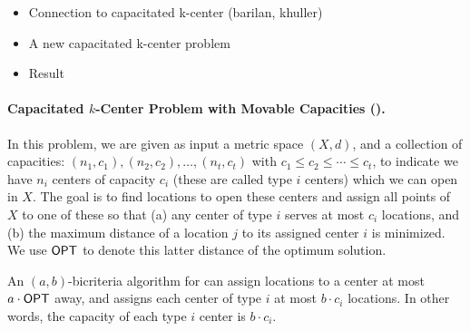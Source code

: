\begin{itemize}
	\item Connection to capacitated k-center (barilan, khuller)
	\item A new capacitated k-center problem
	\item Result
\end{itemize}
\paragraph{Capacitated $k$-Center Problem with Movable Capacities (\mckc).} In this problem, we are given as input a metric space $(X,d)$, and a collection of capacities: $(n_1,c_1), (n_2,c_2),\ldots, (n_t,c_t)$
with $c_1 \leq c_2 \le \cdots \le c_t$,
to indicate we have $n_i$ centers of capacity $c_i$ (these are called type $i$ centers) which we can open in $X$. The goal is to find locations to open these centers and assign all points of $X$ to one of these so that (a) any center of type $i$ serves at most $c_i$ locations, and (b) the maximum distance of a location $j$ to its assigned center $i$ is minimized. We use $\mathsf{OPT}$ to denote this latter distance of the optimum solution.


\begin{definition}
An $(a,b)$-bicriteria algorithm for \mckc can assign locations to a center at most $a\cdot\mathsf{OPT}$ away, and assigns each center of type $i$ at most $b\cdot c_i$ locations. In other words, the capacity of each type $i$ center is $b \cdot c_i$.
\end{definition}

